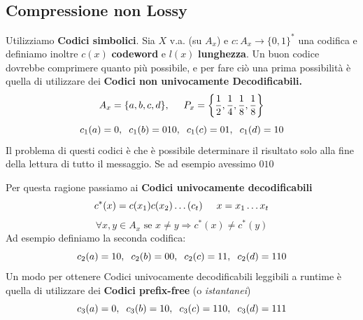 \documentclass{report}
\begin{document}
\subsection{Compressione non Lossy}
Utilizziamo \textbf{Codici simbolici}. Sia $X$ v.a. (su $A_x$) e $c:A_x\rightarrow\{0,1\}^*$ una codifica e definiamo inoltre $c(x)$ \textbf{codeword} e $l(x)$ \textbf{lunghezza}.
\newpage
Un buon codice dovrebbe comprimere quanto più possibile, e per fare ciò una prima possibilità è quella di utilizzare dei \textbf{Codici non univocamente Decodificabili.}
$$A_x = \{a,b,c,d \}, \hspace{0.5cm} P_x=\left\{ \frac{1}{2},\frac{1}{4},\frac{1}{8},\frac{1}{8} \right\}$$ 
$$c_1(a) = 0, \hspace{0.2cm} c_1(b) = 010, \hspace{0.2cm} c_1(c) = 01, \hspace{0.2cm} c_1(d) = 10$$
Il problema di questi codici è che è possibile determinare il risultato solo alla fine della lettura di tutto il messaggio. Se ad esempio avessimo $010$

\begin{center}
\end{center}
Per questa ragione passiamo ai \textbf{Codici univocamente decodificabili}
$$c^*(x) = c(x_1)c(x_2)\dots(c_t) \hspace{0.5cm} x = x_1\dots x_t$$
$$\forall x,y\in A_x \text{ se }x\neq y \Rightarrow c^*(x)\neq c^*(y)$$
Ad esempio definiamo la seconda codifica:
$$c_2(a) = 10, \hspace{0.2cm} c_2(b) = 00, \hspace{0.2cm} c_2(c) = 11, \hspace{0.2cm} c_2(d) = 110$$
Un modo per ottenere Codici univocamente decodificabili leggibili a runtime è quella di utilizzare dei \textbf{Codici prefix-free} (o \textit{istantanei})
$$c_3(a) = 0, \hspace{0.2cm} c_3(b) = 10, \hspace{0.2cm} c_3(c) = 110, \hspace{0.2cm} c_3(d) = 111$$
\end{document}
